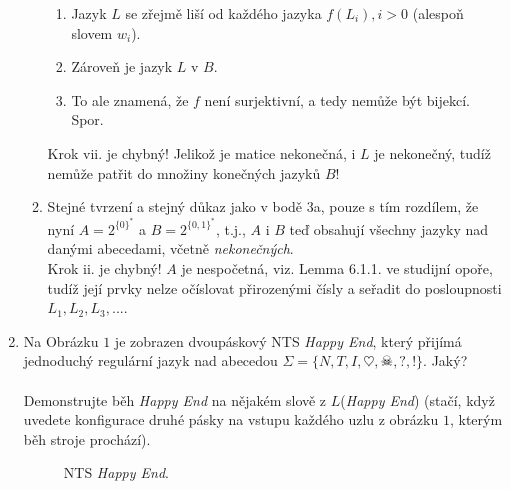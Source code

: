 \documentclass[a4paper,11pt]{article}[24.3.2010]
\begin{document}
\begin{enumerate}
\begin{enumerate}
\begin{enumerate}
\item Jazyk $L$ se zřejmě liší od každého jazyka $f(L_{i}),i>0$  (alespoň slovem $w_{i}$).
\item Zároveň je jazyk $L$ v $B$.
\item To ale znamená, že $f$ není surjektivní, a tedy nemůže být bijekcí. Spor.\\
\end{enumerate}
Krok vii. je chybný! Jelikož je matice nekonečná, i $L$ je nekonečný, tudíž nemůže patřit do množiny konečných jazyků $B$!\\
\item Stejné tvrzení a stejný důkaz jako v bodě 3a, pouze s tím rozdílem, že nyní $A = 2^{\{0\}^*}$ a $B = 2^{\{0,1\}^*}$, t.j., $A$ i $B$ teď obsahují všechny jazyky nad danými abecedami, včetně \emph{nekonečných}.\\

Krok ii. je chybný! $A$ je nespočetná, viz. Lemma 6.1.1. ve studijní opoře, tudíž její prvky nelze očíslovat přirozenými čísly a seřadit do posloupnosti $L_{1},L_{2},L_{3},...$.

\end{enumerate} 
\renewcommand{\theenumi}{\arabic{enumi}}

\newpage

\item Na Obrázku $1$ je zobrazen dvoupáskový NTS \emph{Happy End}, který přijímá jednoduchý regulární jazyk nad abecedou $\Sigma=\{N,T,I,\heartsuit,\skull,?,!\}$. Jaký?\\\\
Demonstrujte běh \emph{Happy End} na nějakém slově z $L$(\emph{Happy End}) (stačí, když uvedete konfigurace druhé pásky na vstupu každého uzlu z obrázku $1$, kterým běh stroje prochází). 

\begin{figure}[htbp]
  \centering
  \caption{NTS \emph{Happy End}.}
\end{figure} 


\end{enumerate}
\end{document}
